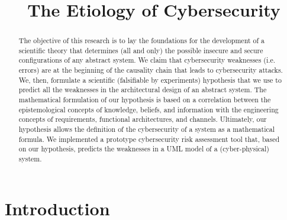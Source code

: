 \documentclass[conference]{IEEEtran}
\begin{document}
\title{The Etiology of Cybersecurity}

\author{
}

\maketitle

\begin{abstract}
	The objective of this research is to lay the foundations for the
	development of a scientific theory that determines (all and only) the possible
	insecure and secure configurations of any abstract system. We claim
	that cybersecurity weaknesses (i.e. errors) are at the beginning of the
	causality chain that leads to cybersecurity attacks.  We, then,
	formulate a scientific (falsifiable by experiments) hypothesis that we
	use to predict all the weaknesses in the architectural design of an
	abstract system. The mathematical formulation of our hypothesis is
	based on a correlation between the epistemological concepts of
	knowledge, beliefs, and information with the engineering concepts of
	requirements, functional architectures, and channels.  Ultimately, our
	hypothesis allows the definition of the cybersecurity of a system as a
	mathematical formula.  We implemented a prototype cybersecurity risk
	assessment tool that, based on our hypothesis, predicts the weaknesses in a
	UML model of a (cyber-physical) system.
\end{abstract}

\IEEEpeerreviewmaketitle

\section{Introduction}\label{sec:intro}
\end{document}
